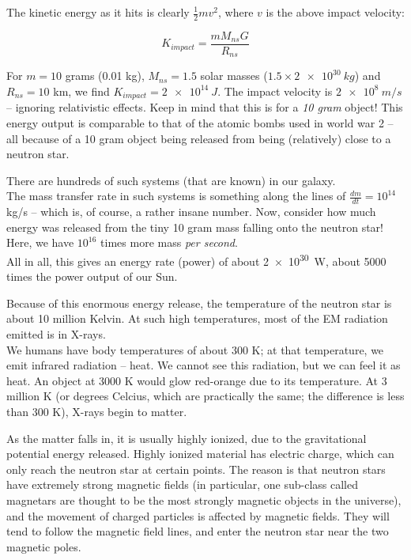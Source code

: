 The kinetic energy as it hits is clearly $\displaystyle \frac{1}{2} m v^2$, where $v$ is the above impact velocity:

\begin{equation}
K_{impact} = \frac{m M_{ns} G}{R_{ns}}
\end{equation}

For $m = 10$ grams (0.01 kg), $M_{ns} = 1.5$ solar masses ($1.5 \times \SI{2e30}{kg}$) and $R_{ns} = 10$ km, we find $K_{impact} = \SI{2e14}{J}$. The impact velocity is $\SI{2e8}{m/s}$ -- ignoring relativistic effects. Keep in mind that this is for a \emph{10 gram} object! This energy output is comparable to that of the atomic bombs used in world war 2 -- all because of a 10 gram object being released from being (relatively) close to a neutron star.

There are hundreds of such systems (that are known) in our galaxy.\\
The mass transfer rate in such systems is something along the lines of $\displaystyle \frac{dm}{dt} = 10^{14}$ kg/s -- which is, of course, a rather insane number. Now, consider how much energy was released from the tiny 10 gram mass falling onto the neutron star! Here, we have $10^{16}$ times more mass \emph{per second}.\\
All in all, this gives an energy rate (power) of about \SI{2e30}{W}, about 5000 times the power output of our Sun.

Because of this enormous energy release, the temperature of the neutron star is about 10 million Kelvin. At such high temperatures, most of the EM radiation emitted is in X-rays.\\
We humans have body temperatures of about 300 K; at that temperature, we emit infrared radiation -- heat. We cannot see this radiation, but we can feel it as heat. An object at 3000 K would glow red-orange due to its temperature. At 3 million K (or degrees Celcius, which are practically the same; the difference is less than 300 K), X-rays begin to matter.

As the matter falls in, it is usually highly ionized, due to the gravitational potential energy released. Highly ionized material has electric charge, which can only reach the neutron star at certain points. The reason is that neutron stars have extremely strong magnetic fields (in particular, one sub-class called magnetars are thought to be the most strongly magnetic objects in the universe), and the movement of charged particles is affected by magnetic fields. They will tend to follow the magnetic field lines, and enter the neutron star near the two magnetic poles.

